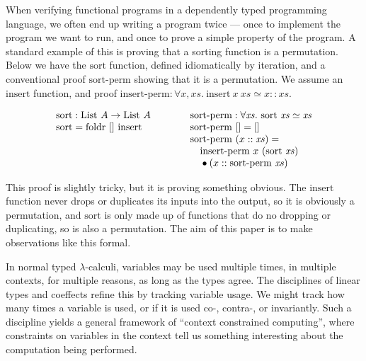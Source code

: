 When verifying functional programs in a dependently typed programming language,
we often end up writing a program twice --- once to implement the program we
want to run, and once to prove a simple property of the program.
A standard example of this is proving that a sorting function is a permutation.
Below we have the $\textrm{sort}$ function, defined idiomatically by iteration,
and a conventional proof $\textrm{sort-perm}$ showing that it is a permutation.
We assume an $\textrm{insert}$ function, and proof $\textrm{insert-perm} :
\forall x,\mathit{xs}.~\textrm{insert}~x~xs \simeq x :: xs$.

\[
  \begin{array}{ll}
    \begin{array}[t]{l}
      \textrm{sort} : \textrm{List}~A \to \textrm{List}~A \\
      \textrm{sort} = \textrm{foldr}~[]~\textrm{insert}
    \end{array}
    \quad & \quad
      \begin{array}[t]{l}
        \textrm{sort-perm} : \forall\mathit{xs}.~\textrm{sort}~\mathit{xs} \simeq \mathit{xs} \\
        \textrm{sort-perm}~[] = [] \\
        \textrm{sort-perm}~(x :: \mathit{xs}) = \\
        \quad \textrm{insert-perm}~x~(\textrm{sort}~\mathit{xs}) \\
        \quad {}\bullet (x :: \textrm{sort-perm}~\mathit{xs})
      \end{array}
  \end{array}
\]

This proof is slightly tricky, but it is proving something obvious.
The $\textrm{insert}$ function never drops or duplicates its inputs into the
output, so it is obviously a permutation, and $\textrm{sort}$ is only made up of
functions that do no dropping or duplicating, so is also a permutation.
The aim of this paper is to make observations like this formal.

 In normal typed $\lambda$-calculi, variables may be used multiple
times, in multiple contexts, for multiple reasons, as long as the
types agree. The disciplines of linear types \cite{girard87linear} and
coeffects \cite{PetricekOM14,BrunelGMZ14,GhicaS14} refine this by
tracking variable usage. We might track how many times a variable is
used, or if it is used co-, contra-, or invariantly. Such a discipline
yields a general framework of ``context constrained computing'', where
constraints on variables in the context tell us something interesting
about the computation being performed.

